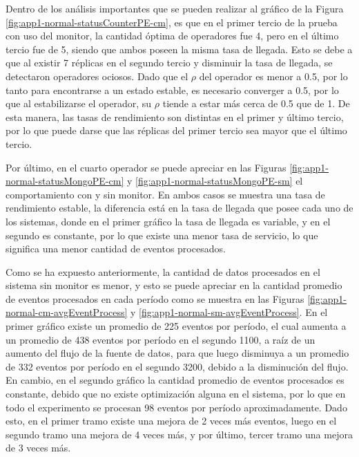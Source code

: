 
Dentro de los análisis importantes que se pueden realizar al gráfico de la Figura \ref{fig:app1-normal-statusCounterPE-cm}, es que en el primer tercio de la prueba con uso del monitor, la cantidad óptima de operadores fue 4, pero en el último tercio fue de 5, siendo que ambos poseen la misma tasa de llegada. Esto se debe a que al existir 7 réplicas en el segundo tercio y disminuir la tasa de llegada, se detectaron operadores ociosos. Dado que el $\rho$ del operador es menor a 0.5, por lo tanto para encontrarse a un estado estable, es necesario converger a 0.5, por lo que al estabilizarse el operador, su $\rho$ tiende a estar más cerca de 0.5 que de 1. De esta manera, las tasas de rendimiento son distintas en el primer y último tercio, por lo que puede darse que las réplicas del primer tercio sea mayor que el último tercio.

Por último, en el cuarto operador se puede apreciar en las Figuras \ref{fig:app1-normal-statusMongoPE-cm} y \ref{fig:app1-normal-statusMongoPE-sm} el comportamiento con y sin monitor. En ambos casos se muestra una tasa de rendimiento estable, la diferencia está en la tasa de llegada que posee cada uno de los sistemas, donde en el primer gráfico la tasa de llegada es variable, y en el segundo es constante, por lo que existe una menor tasa de servicio, lo que significa una menor cantidad de eventos procesados.

Como se ha expuesto anteriormente, la cantidad de datos procesados en el sistema sin monitor es menor, y esto se puede apreciar en la cantidad promedio de eventos procesados en cada período como se muestra en las Figuras \ref{fig:app1-normal-cm-avgEventProcess} y \ref{fig:app1-normal-sm-avgEventProcess}. En el primer gráfico existe un promedio de 225 eventos por período, el cual aumenta a un promedio de 438 eventos por período en el segundo 1100, a raíz de un aumento del flujo de la fuente de datos, para que luego disminuya a un promedio de 332 eventos por período en el segundo 3200, debido a la disminución del flujo. En cambio, en el segundo gráfico la cantidad promedio de eventos procesados es constante, debido que no existe optimización alguna en el sistema, por lo que en todo el experimento se procesan 98 eventos por período aproximadamente. Dado esto, en el primer tramo existe una mejora de 2 veces más eventos, luego en el segundo tramo una mejora de 4 veces más, y por último, tercer tramo una mejora de 3 veces más.

